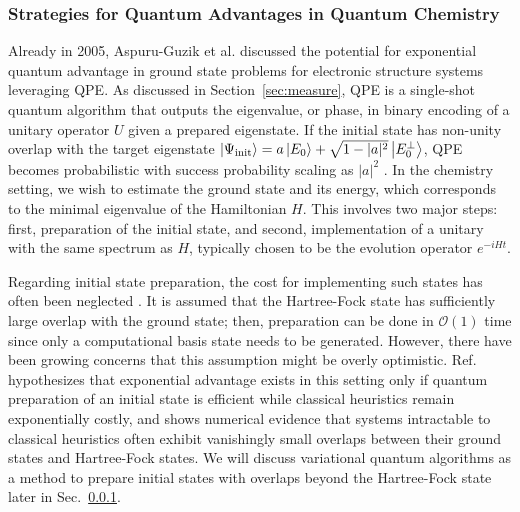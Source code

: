 \documentclass[../main.tex]{subfiles}
\begin{document}
\subsubsection{Strategies for Quantum Advantages in Quantum Chemistry}\label{subsub:quantumquantumchem}

Already in 2005, Aspuru-Guzik et al. \cite{aspuru2005simulated} discussed the potential for exponential quantum advantage in ground state problems for electronic structure systems leveraging \ac{QPE}. As discussed in Section~\ref{sec:measure}, QPE is a single-shot quantum algorithm that outputs the eigenvalue, or phase, in binary encoding of a unitary operator $U$ given a prepared eigenstate. If the initial state has non-unity overlap with the target eigenstate $\ket{\Psi_\mathrm{init}} = a \ket{E_0} + \sqrt{1-|a|^2} \ket{E_0^\perp}$, QPE becomes probabilistic with success probability scaling as $|a|^2$ \cite{reiher2016elucidating}. In the chemistry setting, we wish to estimate the ground state and its energy, which corresponds to the minimal eigenvalue of the Hamiltonian $H$. This involves two major steps: first, preparation of the initial state, and second, implementation of a unitary with the same spectrum as $H$, typically chosen to be the evolution operator $e^{-iHt}$.

Regarding initial state preparation, the cost for implementing such states has often been neglected \cite{reiher2016elucidating, babbush2015exponentially}. It is assumed that the Hartree-Fock state has sufficiently large overlap with the ground state; then, preparation can be done in $\mathcal{O}(1)$ time since only a computational basis state needs to be generated. However, there have been growing concerns that this assumption might be overly optimistic. Ref.~\cite{lee2023evaluating} hypothesizes that exponential advantage exists in this setting only if quantum preparation of an initial state is efficient while classical heuristics remain exponentially costly, and shows numerical evidence that systems intractable to classical heuristics often exhibit vanishingly small overlaps between their ground states and Hartree-Fock states. We will discuss variational quantum algorithms as a method to prepare initial states with overlaps beyond the Hartree-Fock state later in Sec.~\ref{subsub:quantumquantumchem}.
\end{document}
